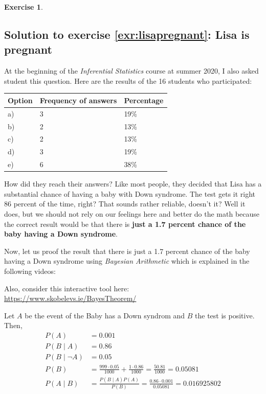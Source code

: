 \documentclass[
  12pt,
  oneside]{book}
\theoremstyle{definition}
\theoremstyle{definition}
\theoremstyle{definition}
\newtheorem{exercise}{Exercise}[chapter]
\theoremstyle{definition}
\theoremstyle{remark}
\begin{document}
\begin{exercise}
\hypertarget{sol:lisapregnant}{%
\subsection*{Solution to exercise \ref{exr:lisapregnant}: Lisa is pregnant}\label{sol:lisapregnant}}

At the beginning of the \emph{Inferential Statistics} course at summer 2020, I also asked student this question. Here are the results of the 16 students who participated:

\begin{longtable}[]{@{}lll@{}}
\toprule()
Option & Frequency of answers & Percentage \\
\midrule()
\endhead
a) & 3 & 19\% \\
b) & 2 & 13\% \\
c) & 2 & 13\% \\
d) & 3 & 19\% \\
e) & 6 & 38\% \\
\bottomrule()
\end{longtable}

How did they reach their answers? Like most people, they decided that Lisa has a substantial chance of having a baby with Down syndrome. The test gets it right 86 percent of the time, right? That sounds rather reliable, doesn't it? Well it does, but we should not rely on our feelings here and better do the math because the correct result would be that there is \textbf{just a 1.7 percent chance of the baby having a Down syndrome}.

Now, let us proof the result that there is just a 1.7 percent chance of the baby having a Down syndrome using \emph{Bayesian Arithmetic} which is explained in the following videos:

Also, consider this interactive tool here: \url{https://www.skobelevs.ie/BayesTheorem/}

Let \(A\) be the event of the Baby has a Down syndrom and \(B\) the test is positive. Then,
\begin{align*}
    P(A)&=0.001\\
    P(B\mid A)&=0.86\\
    P(B\mid \neg A)&=0.05\\
    P(B)&=\frac{999\cdot 0.05}{1000}+\frac{1\cdot 0.86}{1000}=\frac{50.81}{1000}=0.05081\\
    P(A\mid B)&={\frac {P(B\mid A)P(A)}{P(B)}}=\frac{0.86 \cdot 0.001}{0.05081}=0.016925802
\end{align*}


\end{exercise}
\end{document}
